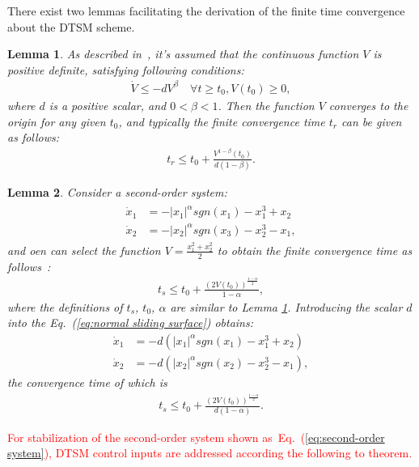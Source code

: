 \documentclass[3p]{elsarticle}
\theoremstyle{plain}
\newtheorem{mylem}{Lemma}
\theoremstyle{remark}
\begin{document}
There exist two lemmas facilitating the derivation of the finite time convergence about the DTSM scheme.
\begin{mylem}
As described in~\cite{moulay2006finite}, it's assumed that the continuous function $V$ is positive definite, satisfying following conditions:
\begin{align}
\dot V\le -dV^\beta\quad\forall t\ge t_0, V(t_0)\ge 0,
\end{align}
where $d$ is a positive scalar, and $0<\beta<1$. Then the function $V$ converges to the origin for any given $t_0$, and typically the finite convergence time $t_r$ can be given as follows:
\begin{align}
t_r \le t_0+\frac{V^{1-\beta}(t_0)}{d(1-\beta)}.
\end{align}\label{lemma:1}
\end{mylem}
\begin{mylem}
Consider a second-order system:
\begin{align}
\begin{split}
\dot x_1&=-\vert x_1\vert^\alpha sgn(x_1)-x_1^3+x_2\\
\dot x_2&=-\vert x_2\vert^\alpha sgn(x_3)-x_2^3-x_1,\label{eq:normal sliding surface}
\end{split}
\end{align}
and oen can select the function $V = \frac{x_1^2+x_2^2}{2}$ to obtain the finite convergence time as follows~\cite{moulay2006finite}:
\begin{align}
t_s\le t_0+\frac{(2V(t_0))^{\frac{1-\alpha}{2}}}{1-\alpha},
\end{align}
where the definitions of  $t_s$, $t_0$, $\alpha$ are similar to Lemma \ref{lemma:1}. Introducing the scalar $d$ into the Eq.~(\ref{eq:normal sliding surface}) obtains:
\begin{align}
\dot x_1&=-d(\vert x_1\vert^\alpha sgn(x_1)-x_1^3+x_2)\\
\dot x_2&=-d(\vert x_2\vert^\alpha sgn(x_2)-x_2^3-x_1),\label{eq:more normal sliding surface}
\end{align}
the convergence time of which is
\begin{align}
t_s\le t_0+\frac{(2V(t_0))^{\frac{1-\alpha}{2}}}{d(1-\alpha)}.
\end{align}\label{lemma:2}
\end{mylem}
\textcolor{red}{For stabilization of the second-order system shown as~Eq.~(\ref{eq:second-order system}), DTSM control inputs are addressed according the following to theorem.}
\end{document}
